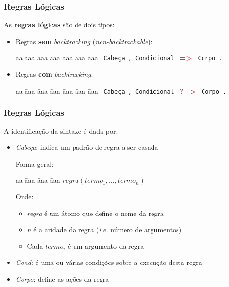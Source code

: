 \begin{frame}[fragile]

\frametitle{Regras Lógicas}

As \textbf{regras lógicas} são de dois tipos:

        \begin{itemize}
            \item Regras \textbf{sem} {\em backtracking} (\textit{non-backtrackable}):
        	
            \begin{tabbing}
              aa \= aaa \= aaa \= aaa \= aaa \= aaa \= aaa \kill
             \> \> \verb+ Cabeça , Condicional + \textbf{\textcolor{red}{=>}} \verb+ Corpo .+
            \end{tabbing}
            
        \pause

            \item Regras \textbf{com} {\em backtracking}:
            
            \begin{tabbing}
              aa \= aaa \= aaa \= aaa \= aaa \= aaa \= aaa \kill
             \> \> \verb+ Cabeça , Condicional + \textbf{\textcolor{red}{?=>}} \verb+ Corpo .+
            \end{tabbing}
        \end{itemize}

\end{frame}


\begin{frame}[fragile]

\frametitle{Regras Lógicas}
     
  A identificação da sintaxe é dada por:

  \begin{itemize}
  
      \item \emph{Cabeça}: indica um padrão de regra a ser casada
      
      Forma geral:
      \begin{tabbing}
          aa \= aaa \= aaa \= aaa \kill
          \> \> $regra(termo_1, \ldots,termo_n)$
      \end{tabbing}
      
      Onde:
      
      \begin{itemize}
          \item \emph{regra} é um átomo  que define o nome da regra
          \item \emph{n} é a aridade da regra (\emph{i.e.} número de argumentos)
          \item Cada \emph{$termo_i$} é um argumento da regra
      \end{itemize}
      
      \item \emph{Cond}: é uma ou várias condições sobre a execução desta regra
          
      \item \emph{Corpo}: define as ações da regra 
      
  \end{itemize}
\end{frame}


